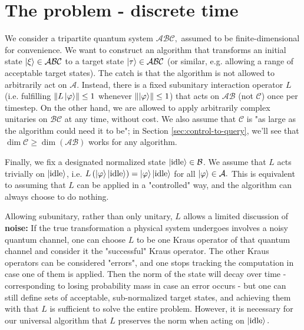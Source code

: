 \documentclass{article}
\begin{document}
\section{The problem - discrete time}
\label{sec:problem}
We consider a tripartite quantum system $\mathcal{ABC} ,$ assumed to be finite-dimensional for convenience. We want to construct an algorithm that transforms an initial state $\displaystyle \ket{\xi } \in \mathcal{ABC}$ to a target state $\displaystyle \ket{\tau } \in \mathcal{ABC}$ (or similar, e.g. allowing a range of acceptable target states). The catch is that the algorithm is not allowed to arbitrarily act on $\displaystyle \mathcal{A}$. Instead, there is a fixed subunitary interaction operator $\displaystyle L$ (i.e. fulfilling $\displaystyle \left\Vert L\ket{\varphi }\right\Vert \leq 1$ whenever $\displaystyle \left\Vert \ket{\varphi }\right\Vert \leq 1$) that acts on $\displaystyle \mathcal{AB}$ (not $\mathcal{C}$) once per timestep. On the other hand, we are allowed to apply arbitrarily complex unitaries on $\displaystyle \mathcal{BC}$ at any time, without cost. We also assume that $\displaystyle \mathcal{C}$ is "as large as the algorithm could need it to be"; in Section \ref{sec:control-to-query}, we'll see that  $\displaystyle \dim\mathcal{C} \geq \dim(\mathcal{AB})$ works for any algorithm.



Finally, we fix a designated normalized state $\displaystyle \ket{\mathrm{idle}} \in \mathcal{B}$. We assume that $\displaystyle L$ acts trivially on $\displaystyle \ket{\mathrm{idle}}$, i.e. $\displaystyle L\left(\ket{\varphi }\ket{\mathrm{idle}}\right) =\ket{\varphi }\ket{\mathrm{idle}}$ for all $\displaystyle \ket{\varphi } \in \mathcal{A} .$ This is equivalent to assuming that $\displaystyle L$ can be applied in a "controlled" way, and the algorithm can always choose to do nothing.



Allowing subunitary, rather than only unitary, $\displaystyle L$ allows a limited discussion of \textbf{noise:} If the true transformation a physical system undergoes involves a noisy quantum channel, one can choose $\displaystyle L$ to be one Kraus operator of that quantum channel and consider it the "successful" Kraus operator. The other Kraus operators can be considered "errors", and one stops tracking the computation in case one of them is applied. Then the norm of the state will decay over time - corresponding to losing probability mass in case an error occurs - but one can still define sets of acceptable, sub-normalized target states, and achieving them with that $\displaystyle L$ is sufficient to solve the entire problem. However, it is necessary for our universal algorithm that $\displaystyle L$ preserves the norm when acting on $\displaystyle \ket{\mathrm{idle}} .$
\end{document}

